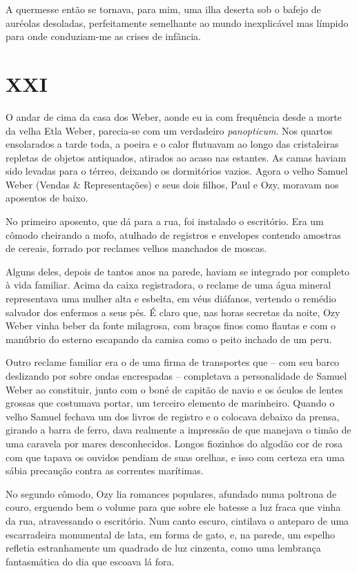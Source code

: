 A quermesse então se tornava, para mim, uma ilha deserta sob o bafejo de auréolas desoladas, perfeitamente semelhante ao mundo inexplicável mas límpido para onde conduziam-me as crises de infância.


\chapter*{\centering\Large{XXI}}

O andar de cima da casa dos Weber, aonde eu ia com frequência desde a morte da velha Etla Weber, parecia-se com um verdadeiro \textit{panopticum}. Nos quartos ensolarados a tarde toda, a poeira e o calor flutuavam ao longo das cristaleiras repletas de objetos antiquados, atirados ao acaso nas estantes. As camas haviam sido levadas para o térreo, deixando os dormitórios vazios. Agora o velho Samuel Weber (Vendas \& Representações) e seus dois filhos, Paul e Ozy, moravam nos aposentos de baixo.

No primeiro aposento, que dá para a rua, foi instalado o escritório. Era um cômodo cheirando a mofo, atulhado de registros e envelopes contendo amostras de cereais, forrado por reclames velhos manchados de moscas.

Alguns deles, depois de tantos anos na parede, haviam se integrado por completo à vida familiar. Acima da caixa registradora, o reclame de uma água mineral representava uma mulher alta e esbelta, em véus diáfanos, vertendo o remédio salvador dos enfermos a seus pés. É claro que, nas horas secretas da noite, Ozy Weber vinha beber da fonte milagrosa, com braços finos como flautas e com o manúbrio do esterno escapando da camisa como o peito inchado de um peru.

Outro reclame familiar era o de uma firma de transportes que -- com seu barco deslizando por sobre ondas encrespadas -- completava a personalidade de Samuel Weber ao constituir, junto com o boné de capitão de navio e os óculos de lentes grossas que costumava portar, um terceiro elemento de marinheiro. Quando o velho Samuel fechava um dos livros de registro e o colocava debaixo da prensa, girando a barra de ferro, dava realmente a impressão de que manejava o timão de uma caravela por mares desconhecidos. Longos fiozinhos do algodão cor de rosa com que tapava os ouvidos pendiam de suas orelhas, e isso com certeza era uma sábia precaução contra as correntes marítimas.

No segundo cômodo, Ozy lia romances populares, afundado numa poltrona de couro, erguendo bem o volume para que sobre ele batesse a luz fraca que vinha da rua, atravessando o escritório. Num canto escuro, cintilava o anteparo de uma escarradeira monumental de lata, em forma de gato, e, na parede, um espelho refletia estranhamente um quadrado de luz cinzenta, como uma lembrança fantasmática do dia que escoava lá fora.


